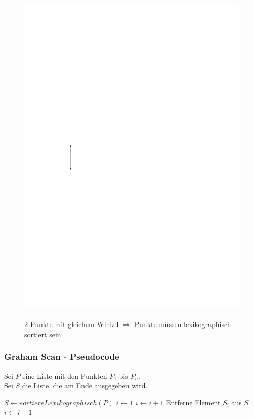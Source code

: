 \begin{frame}
\begin{figure}[htbp]
\begin{minipage}[b]{.4\linewidth}
    \includegraphics[width=\linewidth]{bilder/sonderfall2}
    \\
    \\
    \tiny{2 Punkte mit gleichem Winkel $\Rightarrow$ Punkte müssen lexikographisch sortiert sein}
    \end{minipage}
\end{figure}


\end{frame}


\begin{frame}
	\frametitle{{Graham Scan - Pseudocode}}
	Sei $P$ eine Liste mit den Punkten $P_1$ bis $P_n$.\\
	Sei $S$ die Liste, die am Ende ausgegeben wird.
	\begin{algorithmic}
	\State $S \gets sortiereLexikographisch(P)$
	\State $i \gets 1$
		\State $i \gets i + 1$
		\Else 
		\State Entferne Element $S_i$ aus $S$
		\State $i \gets i - 1$
		\EndIf
	\EndWhile
	\end{algorithmic}
\end{frame}


